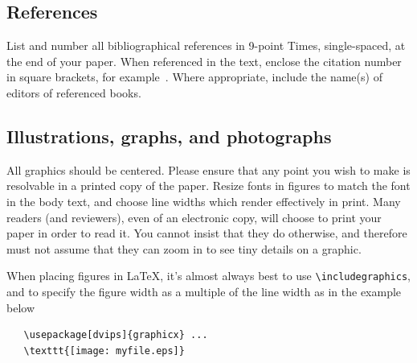 \documentclass[10pt,twocolumn,letterpaper]{article}
\begin{document}
\subsection{References}

List and number all bibliographical references in 9-point Times,
single-spaced, at the end of your paper. When referenced in the text,
enclose the citation number in square brackets, for
example~\cite{Authors14}.  Where appropriate, include the name(s) of
editors of referenced books.


\subsection{Illustrations, graphs, and photographs}

All graphics should be centered.  Please ensure that any point you wish to
make is resolvable in a printed copy of the paper.  Resize fonts in figures
to match the font in the body text, and choose line widths which render
effectively in print.  Many readers (and reviewers), even of an electronic
copy, will choose to print your paper in order to read it.  You cannot
insist that they do otherwise, and therefore must not assume that they can
zoom in to see tiny details on a graphic.

When placing figures in \LaTeX, it's almost always best to use
\verb+\includegraphics+, and to specify the  figure width as a multiple of
the line width as in the example below
{\small\begin{verbatim}
   \usepackage[dvips]{graphicx} ...
   \texttt{[image: myfile.eps]}
\end{verbatim}
}





{\small


}
\end{document}
